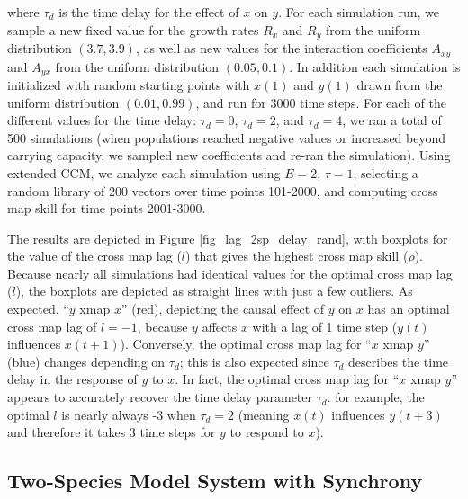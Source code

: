 where $\tau_d$ is the time delay for the effect of $x$ on $y$. For each simulation run, we sample a new fixed value for the growth rates $R_x$ and $R_y$ from the uniform distribution $(3.7, 3.9)$, as well as new values for the interaction coefficients $A_{xy}$ and $A_{yx}$ from the uniform distribution $(0.05, 0.1)$. In addition each simulation is initialized with random starting points with $x(1)$ and $y(1)$ drawn from the uniform distribution $(0.01, 0.99)$, and run for 3000 time steps. For each of the different values for the time delay: $\tau_d = 0$, $\tau_d = 2$, and $\tau_d = 4$, we ran a total of 500 simulations (when populations reached negative values or increased beyond carrying capacity, we sampled new coefficients and re-ran the simulation). Using extended CCM, we analyze each simulation using $E = 2$, $\tau = 1$, selecting a random library of 200 vectors over time points 101-2000, and computing cross map skill for time points 2001-3000.

The results are depicted in Figure \ref{fig_lag_2sp_delay_rand}, with boxplots for the value of the cross map lag ($l$) that gives the highest cross map skill ($\rho$). Because nearly all simulations had identical values for the optimal cross map lag ($l$), the boxplots are depicted as straight lines with just a few outliers. As expected, ``$y$ xmap $x$'' (red), depicting the causal effect of $y$ on $x$ has an optimal cross map lag of $l = -1$, because $y$ affects $x$ with a lag of 1 time step ($y(t)$ influences $x(t+1)$). Conversely, the optimal cross map lag for ``$x$ xmap $y$'' (blue) changes depending on $\tau_d$; this is also expected since $\tau_d$ describes the time delay in the response of $y$ to $x$. In fact, the optimal cross map lag for ``$x$ xmap $y$'' appears to accurately recover the time delay parameter $\tau_d$: for example, the optimal $l$ is nearly always -3 when $\tau_d = 2$ (meaning $x(t)$ influences $y(t+3)$ and therefore it takes 3 time steps for $y$ to respond to $x$).

\subsection{Two-Species Model System with Synchrony}

